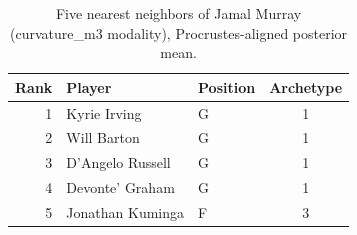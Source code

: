 \begin{table}[htbp]
  \centering\small
  \begin{tabular}{rllc}
    \toprule
    Rank & Player & Position & Archetype \\
    \midrule
    1 & Kyrie Irving & G & 1 \\
    2 & Will Barton & G & 1 \\
    3 & D'Angelo Russell & G & 1 \\
    4 & Devonte' Graham & G & 1 \\
    5 & Jonathan Kuminga & F & 3 \\
    \bottomrule
  \end{tabular}
  \caption{Five nearest neighbors of Jamal Murray (curvature_m3 modality), Procrustes-aligned posterior mean.}
  \label{tab:Jamal_Murray_neighbors_curvature_m3}
\end{table}

